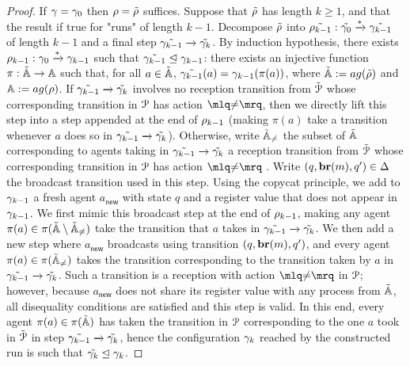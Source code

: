 \begin{proof}
	If $\gamma = \gamma_0$ then $\rho = \tilde{\rho}$ suffices. Suppose that $\tilde{\rho}$ has length $k \geq 1$, and that the result if true for "runs" of length $k-1$. Decompose $\tilde{\rho}$ into $\tilde{\rho_{k-1}}: \tilde{\gamma_0} \xrightarrow{*} \tilde{\gamma_{k-1}}$ of length $k-1$ and a final step $\tilde{\gamma_{k-1}} \xrightarrow{} \tilde{\gamma_k}$. 
	By induction hypothesis, there exists $\rho_{k-1}: \gamma_0 \xrightarrow{*} \gamma_{k-1}$ such that $\tilde{\gamma_{k-1}} \trianglelefteq \gamma_{k-1}$: there exists an injective function $\pi : \tilde{\mathbb{A}} \rightarrow \mathbb{A}$
	such that, for all $a \in \tilde{\mathbb{A}}$, $\tilde{\gamma_{k-1}}(a) = \gamma_{k-1}(\pi(a))$, where $\tilde{\agents} := \agentsof{\tilde{\run}}$ and $\agents := \agentsof{\run}$. If $\tilde{\gamma_{k-1}} \xrightarrow{} \tilde{\gamma_k}$ involves no reception transition from $\tilde{\mathcal{P}}$ whose corresponding transition in $\mathcal{P}$ has action $\quotemarks{\diseqtestact}$, then we directly lift this step into a step appended at the end of $\rho_{k-1}$ (making $\pi(a)$ take a transition whenever $a$ does so in $\tilde{\gamma_{k-1}} \xrightarrow{} \tilde{\gamma_k}$). Otherwise, write $\tilde{\mathbb{A}}_{{\ne}}$ the subset of $\tilde{\mathbb{A}}$ corresponding to agents taking in $\tilde{\gamma_{k-1}} \xrightarrow{} \tilde{\gamma_k}$ a reception transition from $\tilde{\mathcal{P}}$ whose corresponding transition in $\mathcal{P}$ has action $\quotemarks{\diseqtestact}$ . Write $(q, \textbf{br}(m), q') \in \Delta$ the broadcast transition used in this step.  Using the copycat principle, we add to $\gamma_{k-1}$ a fresh agent $a_{\mathsf{new}}$ with state $q$ and a register value that does not appear in $\gamma_{k-1}$. 
	We first mimic this broadcast step at the end of $\rho_{k-1}$, making any agent $\pi(a) \in \pi(\tilde{\mathbb{A}} \setminus \tilde{\mathbb{A}}_{{\ne}})$ take the transition that $a$ takes in $\tilde{\gamma_{k-1}} \xrightarrow{} \tilde{\gamma_k}$. We then add a new step where $a_{\mathsf{new}}$ broadcasts using transition $(q, \textbf{br}(m), q')$, and every agent $\pi(a) \in \pi(\tilde{\mathbb{A}}_{{\ne}})$ takes the transition corresponding to the transition taken by $a$ in $\tilde{\gamma_{k-1}} \xrightarrow{} \tilde{\gamma_k}$. Such a transition is a reception with action $\quotemarks{\diseqtestact}$ in $\mathcal{P}$; however, because $a_{\mathsf{new}}$ does not share its register value with any process from $\tilde{\mathbb{A}}$, all disequality conditions are satisfied and this step is valid. In this end, every agent $\pi(a) \in \pi(\tilde{\mathbb{A}})$ has taken the transition in $\mathcal{P}$ corresponding to the one $a$ took in $\tilde{\mathcal{P}}$ in step $\tilde{\gamma_{k-1}} \xrightarrow{} \tilde{\gamma_k}$, hence the configuration $\gamma_k$ reached by the constructed run is such that $\tilde{\gamma_k} \trianglelefteq \gamma_k$. 
\end{proof}
\fi

